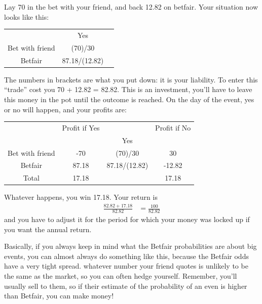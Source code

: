 \documentclass[a4paper]{article}
\begin{document}
Lay 70 in the bet with your friend, and back 12.82 on betfair.
Your situation now looks like this:
\begin{center}
\begin{tabular}{ccc}
\hline
                   &     Yes           &  \\
Bet with friend    &   (70)/30         &  \\
Betfair            &   87.18/(12.82)   &  \\
\hline
\end{tabular}
\end{center}
The numbers in brackets are what you put down: it is your liability.
To enter this ``trade'' cost you 70 + 12.82 = 82.82.
This is an investment, you'll have to leave this money in the pot until the outcome is reached.
On the day of the event, yes or no will happen, and your profits are:
\begin{center}
\begin{tabular}{cc|c|c}
\hline
                  &  Profit if Yes &                   & Profit if No  \\
                  &                &      Yes          &               \\
Bet with friend   &  -70           &   (70)/30         &  30           \\
Betfair           &   87.18        &   87.18/(12.82)   &  -12.82       \\
\hline
Total             &   17.18        &                   &  17.18       \\
\hline
\end{tabular}
\end{center}

Whatever happens, you win 17.18. Your return is
\begin{align*}
 \frac{82.82 + 17.18}{82.82}
 &=
 \frac{100}{82.82}
\end{align*}
and you have to adjust it for the period for which your money was locked up if you want the annual return.

Basically, if you always keep in mind what the Betfair probabilities are about big events, you can almost always do something like this, because the Betfair odds have a very tight spread. whatever number your friend quotes is unlikely to be the same as the market, so you can often hedge yourself. 
Remember, you'll usually sell to them, so if their estimate of the probability of an even is higher than Betfair, you can make money!
\end{document}
